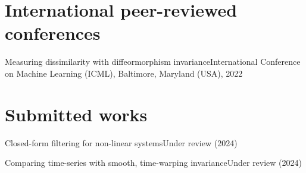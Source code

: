 
\section*{International peer-reviewed conferences}

{Measuring dissimilarity with diffeormorphism invariance}{International Conference on Machine Learning (ICML), Baltimore, Maryland (USA), 2022}

\section*{Submitted works}

{Closed-form filtering for non-linear systems}{Under review (2024)}
\medskip

{Comparing time-series with smooth, time-warping invariance}{Under review (2024)}

